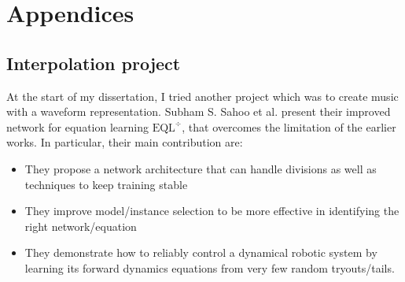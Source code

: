 \documentclass[12pt]{report}
\begin{document}
\newpage





\newpage

\chapter*{Appendices}
\appendix

\section{Interpolation project}

At the start of my dissertation, I tried another project which was to create music with a waveform representation.
Subham S. Sahoo et al. \cite{sahoo_learning_2018} present their improved network for equation learning $\text{EQL}^\div$, that overcomes the limitation of the earlier works. In particular, their main contribution are:
\begin{itemize}
    \item They propose a network architecture that can handle divisions as well as techniques to keep training stable
    \item They improve model/instance selection to be more effective in identifying the right network/equation
    \item They demonstrate how to reliably control a dynamical robotic system by learning its forward dynamics equations from very few random tryouts/tails.
\end{itemize}
\end{document}
